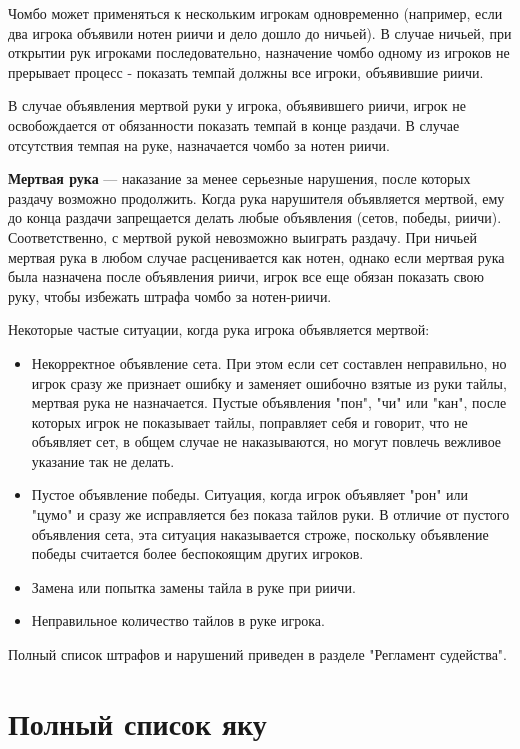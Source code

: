 Чомбо может применяться к нескольким игрокам одновременно (например, если два игрока объявили нотен риичи и дело дошло до ничьей). В случае ничьей, при открытии рук игроками последовательно, назначение чомбо одному из игроков не прерывает процесс - показать темпай должны все игроки, объявившие риичи.

В случае объявления мертвой руки у игрока, объявившего риичи, игрок не освобождается от обязанности показать темпай в конце раздачи. В случае отсутствия темпая на руке, назначается чомбо за нотен риичи. 

\textbf{Мертвая рука} --- наказание за менее серьезные нарушения, после которых раздачу возможно продолжить. Когда рука нарушителя объявляется мертвой, ему до конца раздачи запрещается делать любые объявления (сетов, победы, риичи). Соответственно, с мертвой рукой невозможно выиграть раздачу. При ничьей мертвая рука в любом случае расценивается как нотен, однако если мертвая рука была назначена после объявления риичи, игрок все еще обязан показать свою руку, чтобы избежать штрафа чомбо за нотен-риичи.

Некоторые частые ситуации, когда рука игрока объявляется мертвой:
\begin{itemize}
	\item Некорректное объявление сета. При этом если сет составлен неправильно, но игрок сразу же признает ошибку и заменяет ошибочно взятые из руки тайлы, мертвая рука не назначается. Пустые объявления "пон", "чи" или "кан", после которых игрок не показывает тайлы, поправляет себя и говорит, что не объявляет сет, в общем случае не наказываются, но могут повлечь вежливое указание так не делать.
	\item Пустое объявление победы. Ситуация, когда игрок объявляет "рон" или "цумо" и сразу же исправляется без показа тайлов руки. В отличие от пустого объявления сета, эта ситуация наказывается строже, поскольку объявление победы считается более беспокоящим других игроков.
	\item Замена или попытка замены тайла в руке при риичи.
	\item Неправильное количество тайлов в руке игрока.
\end{itemize}

Полный список штрафов и нарушений приведен в разделе "Регламент судейства".

\section{Полный список яку}

